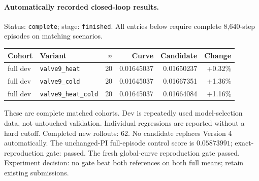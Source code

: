 \paragraph{Automatically recorded closed-loop results.}
Status: \texttt{complete}; stage: \texttt{finished}.
All entries below require complete 8,640-step episodes on matching scenarios.
\begin{center}\small
\begin{tabular}{llrrrr}\toprule
Cohort & Variant & $n$ & Curve & Candidate & Change \\\midrule
full dev & \texttt{valve9\_heat} & 20 & 0.01645037 & 0.01650237 & +0.32\% \\
full dev & \texttt{valve9\_cold} & 20 & 0.01645037 & 0.01667351 & +1.36\% \\
full dev & \texttt{valve9\_heat\_cold} & 20 & 0.01645037 & 0.01664084 & +1.16\% \\
\bottomrule\end{tabular}\end{center}
These are complete matched cohorts. Dev is repeatedly used model-selection data, not untouched validation. Individual regressions are reported without a hard cutoff.
Completed new rollouts: 62. No candidate replaces Version 4 automatically.
The unchanged-PI full-episode control score is $0.05873991$; exact-reproduction gate: passed.
The fresh global-curve reproduction gate passed.
Experiment decision: no gate beat both references on both full means; retain existing submissions.
